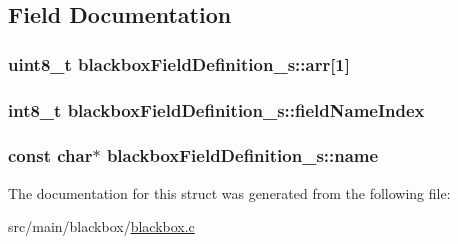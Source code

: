 \subsection{Field Documentation}
\hypertarget{structblackboxFieldDefinition__s_aec4b00cdd2a769170d845bdc45487f04}{
\subsubsection[{arr}]{\setlength{\rightskip}{0pt plus 5cm}uint8\+\_\+t blackbox\+Field\+Definition\+\_\+s\+::arr\mbox{[}1\mbox{]}}}\label{structblackboxFieldDefinition__s_aec4b00cdd2a769170d845bdc45487f04}
\hypertarget{structblackboxFieldDefinition__s_a791ef6ce5e62808da2974cea600821c3}{
\subsubsection[{field\+Name\+Index}]{\setlength{\rightskip}{0pt plus 5cm}int8\+\_\+t blackbox\+Field\+Definition\+\_\+s\+::field\+Name\+Index}}\label{structblackboxFieldDefinition__s_a791ef6ce5e62808da2974cea600821c3}
\hypertarget{structblackboxFieldDefinition__s_ae59344846f0ec1176a4e5d9614bd6527}{
\subsubsection[{name}]{\setlength{\rightskip}{0pt plus 5cm}const char$\ast$ blackbox\+Field\+Definition\+\_\+s\+::name}}\label{structblackboxFieldDefinition__s_ae59344846f0ec1176a4e5d9614bd6527}


The documentation for this struct was generated from the following file\+:\begin{DoxyCompactItemize}
\item 
src/main/blackbox/\hyperlink{blackbox_8c}{blackbox.\+c}\end{DoxyCompactItemize}
